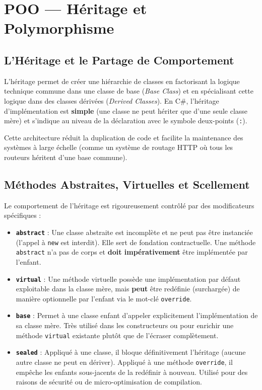 
\newpage
\section{POO — Héritage et Polymorphisme}

\subsection{L'Héritage et le Partage de Comportement}

L'héritage permet de créer une hiérarchie de classes en factorisant la logique technique commune dans une classe de base (\textit{Base Class}) et en spécialisant cette logique dans des classes dérivées (\textit{Derived Classes}). En C\#, l'héritage d'implémentation est \textbf{simple} (une classe ne peut hériter que d'une seule classe mère) et s'indique au niveau de la déclaration avec le symbole deux-points (\texttt{:}).

Cette architecture réduit la duplication de code et facilite la maintenance des systèmes à large échelle (comme un système de routage HTTP où tous les routeurs héritent d'une base commune).

\subsection{Méthodes Abstraites, Virtuelles et Scellement}

Le comportement de l'héritage est rigoureusement contrôlé par des modificateurs spécifiques :
\begin{itemize}
    \item \textbf{\texttt{abstract}} : Une classe abstraite est incomplète et ne peut pas être instanciée (l'appel à \texttt{new} est interdit). Elle sert de fondation contractuelle. Une méthode \texttt{abstract} n'a pas de corps et \textbf{doit impérativement} être implémentée par l'enfant.
    \item \textbf{\texttt{virtual}} : Une méthode virtuelle possède une implémentation par défaut exploitable dans la classe mère, mais \textbf{peut} être redéfinie (surchargée) de manière optionnelle par l'enfant via le mot-clé \texttt{override}.
    \item \textbf{\texttt{base}} : Permet à une classe enfant d'appeler explicitement l'implémentation de sa classe mère. Très utilisé dans les constructeurs ou pour enrichir une méthode \texttt{virtual} existante plutôt que de l'écraser complètement.
    \item \textbf{\texttt{sealed}} : Appliqué à une classe, il bloque définitivement l'héritage (aucune autre classe ne peut en dériver). Appliqué à une méthode \texttt{override}, il empêche les enfants sous-jacents de la redéfinir à nouveau. Utilisé pour des raisons de sécurité ou de micro-optimisation de compilation.
\end{itemize}

